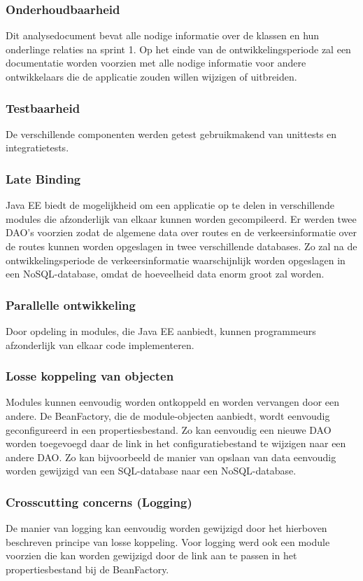 \documentclass[ps,a4paper,oneside]{report}
\begin{document}
\subsubsection{Onderhoudbaarheid}
Dit analysedocument bevat alle nodige informatie over de klassen en hun onderlinge relaties na sprint 1. Op het einde van de ontwikkelingsperiode zal een documentatie worden voorzien met alle nodige informatie voor andere ontwikkelaars die de applicatie zouden willen wijzigen of uitbreiden.
\subsubsection{Testbaarheid}
De verschillende componenten werden getest gebruikmakend van unittests en integratietests.
\subsubsection{Late Binding}
Java EE biedt de mogelijkheid om een applicatie op te delen in verschillende modules die afzonderlijk van elkaar kunnen worden gecompileerd. Er werden twee DAO's voorzien zodat de algemene data over routes en de verkeersinformatie over de routes kunnen worden opgeslagen in twee verschillende databases. Zo zal na de ontwikkelingsperiode de verkeersinformatie waarschijnlijk worden opgeslagen in een NoSQL-database, omdat de hoeveelheid data enorm groot zal worden. 
\subsubsection{Parallelle ontwikkeling}
Door opdeling in modules, die Java EE aanbiedt, kunnen programmeurs afzonderlijk van elkaar code implementeren.
\subsubsection{Losse koppeling van objecten}
Modules kunnen eenvoudig worden ontkoppeld en worden vervangen door een andere. De BeanFactory, die de module-objecten aanbiedt, wordt eenvoudig geconfigureerd in een propertiesbestand. Zo kan eenvoudig een nieuwe DAO worden toegevoegd daar de link in het configuratiebestand te wijzigen naar een andere DAO. Zo kan bijvoorbeeld de manier van opslaan van data eenvoudig worden gewijzigd van een SQL-database naar een NoSQL-database.
\subsubsection{Crosscutting concerns (Logging)}
De manier van logging kan eenvoudig worden gewijzigd door het hierboven beschreven principe van losse koppeling. Voor logging werd ook een module voorzien die kan worden gewijzigd door de link aan te passen in het propertiesbestand bij de BeanFactory.
\clearpage
\end{document}
